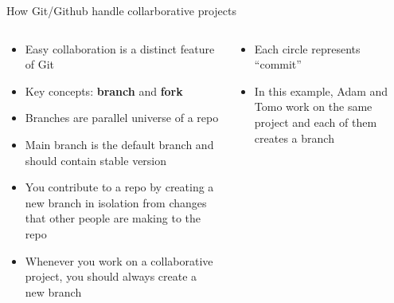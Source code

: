 \documentclass[handout,pdftex,10pt,aspectratio=169]{beamer}
\begin{document}
\begin{frame}{How Git/Github handle collarborative projects}
  \begin{columns}[c]
    \begin{column}{0.55\linewidth}
      \begin{itemize}[<+->]\setlength\itemsep{10pt}
        \item Easy collaboration is a distinct feature of Git
        \item Key concepts: \textbf{branch} and \textbf{fork}
        \item Branches are parallel universe of a repo
        \item Main branch is the default branch and should contain stable version
        \item You contribute to a repo by creating a new branch in isolation from changes
        that other people are making to the repo
        \item Whenever you work on a collaborative project, you should always create a new branch
      \end{itemize}
    \end{column} \hfill
    \begin{column}{0.44\linewidth}
      \begin{itemize}
        \item<7-> Each circle represents ``commit''
        \item<8-> In this example, Adam and Tomo work on the same project and
        each of them creates a branch
      \end{itemize}
    \end{column}
  \end{columns}
\end{frame}
\end{document}
